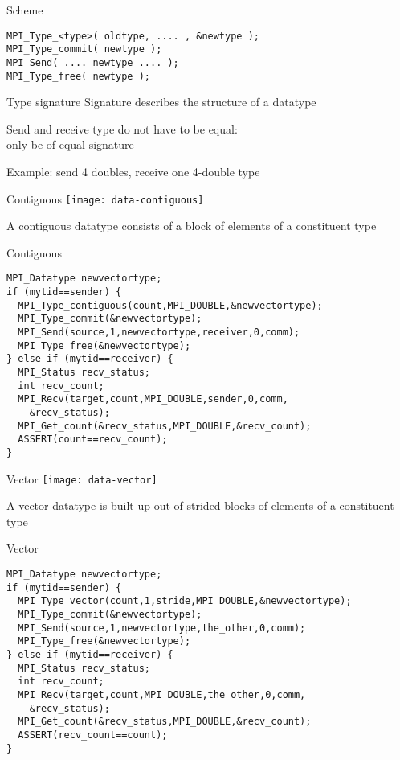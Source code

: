 \begin{frame}[fragile]{Scheme}
\begin{verbatim}
MPI_Type_<type>( oldtype, .... , &newtype );
MPI_Type_commit( newtype );
MPI_Send( .... newtype .... );
MPI_Type_free( newtype );
\end{verbatim}
\end{frame}

\begin{frame}[fragile]{Type signature}
  Signature describes the structure of a datatype

  Send and receive type do not have to be equal:\\
  only be of equal signature

  Example: send 4 doubles, receive one 4-double type
\end{frame}

\begin{frame}{Contiguous}
  \texttt{[image: data-contiguous]}

A contiguous datatype consists of a block of elements of a constituent type
\end{frame}

\begin{frame}[fragile]{Contiguous}
\begin{verbatim}
MPI_Datatype newvectortype;
if (mytid==sender) {
  MPI_Type_contiguous(count,MPI_DOUBLE,&newvectortype);
  MPI_Type_commit(&newvectortype);
  MPI_Send(source,1,newvectortype,receiver,0,comm);
  MPI_Type_free(&newvectortype);
} else if (mytid==receiver) {
  MPI_Status recv_status;
  int recv_count;
  MPI_Recv(target,count,MPI_DOUBLE,sender,0,comm,
    &recv_status);
  MPI_Get_count(&recv_status,MPI_DOUBLE,&recv_count);
  ASSERT(count==recv_count);
}
\end{verbatim}
\end{frame}

\begin{frame}{Vector}
  \texttt{[image: data-vector]}

A vector datatype is built up out of strided blocks of elements of a constituent type
\end{frame}

\begin{frame}[fragile]{Vector}
\small
\begin{verbatim}
MPI_Datatype newvectortype;
if (mytid==sender) {
  MPI_Type_vector(count,1,stride,MPI_DOUBLE,&newvectortype);
  MPI_Type_commit(&newvectortype);
  MPI_Send(source,1,newvectortype,the_other,0,comm);
  MPI_Type_free(&newvectortype);
} else if (mytid==receiver) {
  MPI_Status recv_status;
  int recv_count;
  MPI_Recv(target,count,MPI_DOUBLE,the_other,0,comm,
    &recv_status);
  MPI_Get_count(&recv_status,MPI_DOUBLE,&recv_count);
  ASSERT(recv_count==count);
}
\end{verbatim}
\end{frame}

